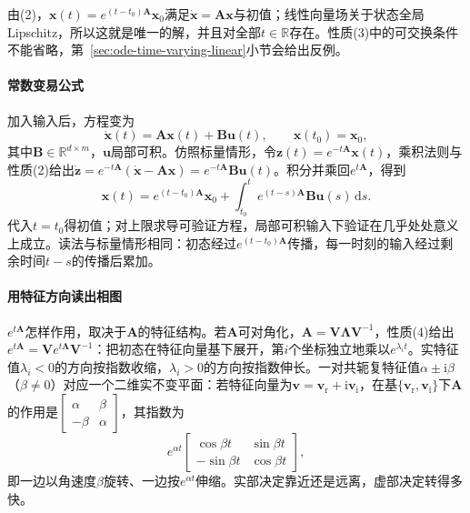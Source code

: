 由(2)，$\bm x(t)=e^{(t-t_0)\bm A}\bm x_0$满足$\dot{\bm x}=\bm A\bm x$与初值；线性向量场关于状态全局Lipschitz，所以这就是唯一的解，并且对全部$t\in\mathbb R$存在。性质(3)中的可交换条件不能省略，第~\ref{sec:ode-time-varying-linear}小节会给出反例。

\paragraph{常数变易公式}
加入输入后，方程变为
\begin{equation}
  \dot{\bm x}(t)=\bm A\bm x(t)+\bm B\bm u(t),\qquad\bm x(t_0)=\bm x_0,
  \label{eq:ode-lti}
\end{equation}
其中$\bm B\in\mathbb R^{d\times m}$，$\bm u$局部可积。仿照标量情形，令$\bm z(t)=e^{-t\bm A}\bm x(t)$，乘积法则与性质(2)给出$\dot{\bm z}=e^{-t\bm A}(\dot{\bm x}-\bm A\bm x)=e^{-t\bm A}\bm B\bm u(t)$。积分并乘回$e^{t\bm A}$，得到
\begin{equation}
  \bm x(t)=e^{(t-t_0)\bm A}\bm x_0+\int_{t_0}^te^{(t-s)\bm A}\bm B\bm u(s)\,\mathrm ds.
  \label{eq:ode-lti-variation}
\end{equation}
代入$t=t_0$得初值；对上限求导可验证方程，局部可积输入下验证在几乎处处意义上成立。读法与标量情形相同：初态经过$e^{(t-t_0)\bm A}$传播，每一时刻的输入经过剩余时间$t-s$的传播后累加。

\paragraph{用特征方向读出相图}
$e^{t\bm A}$怎样作用，取决于$\bm A$的特征结构。若$\bm A$可对角化，$\bm A=\bm V\bm\Lambda\bm V^{-1}$，性质(4)给出$e^{t\bm A}=\bm Ve^{t\bm\Lambda}\bm V^{-1}$：把初态在特征向量基下展开，第$i$个坐标独立地乘以$e^{\lambda_it}$。实特征值$\lambda_i<0$的方向按指数收缩，$\lambda_i>0$的方向按指数伸长。一对共轭复特征值$\alpha\pm\mathrm i\beta$（$\beta\neq0$）对应一个二维实不变平面：若特征向量为$\bm v=\bm v_{\mathrm r}+\mathrm i\bm v_{\mathrm i}$，在基$\{\bm v_{\mathrm r},\bm v_{\mathrm i}\}$下$\bm A$的作用是$\begin{bmatrix}\alpha&\beta\\-\beta&\alpha\end{bmatrix}$，其指数为
\[
  e^{\alpha t}\begin{bmatrix}\cos\beta t&\sin\beta t\\-\sin\beta t&\cos\beta t\end{bmatrix},
\]
即一边以角速度$\beta$旋转、一边按$e^{\alpha t}$伸缩。实部决定靠近还是远离，虚部决定转得多快。

